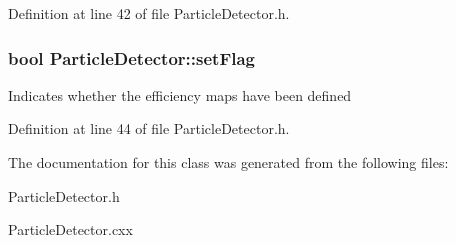 Definition at line 42 of file Particle\-Detector.\-h.

\hypertarget{classParticleDetector_a52a6f3a2af63e5d5b8cd61b53a47e944}{
\subsubsection[{set\-Flag}]{\setlength{\rightskip}{0pt plus 5cm}bool Particle\-Detector\-::set\-Flag\hspace{0.3cm}{\ttfamily [protected]}}}\label{classParticleDetector_a52a6f3a2af63e5d5b8cd61b53a47e944}
Indicates whether the efficiency maps have been defined 

Definition at line 44 of file Particle\-Detector.\-h.



The documentation for this class was generated from the following files\-:\begin{DoxyCompactItemize}
\item 
Particle\-Detector.\-h\item 
Particle\-Detector.\-cxx\end{DoxyCompactItemize}

